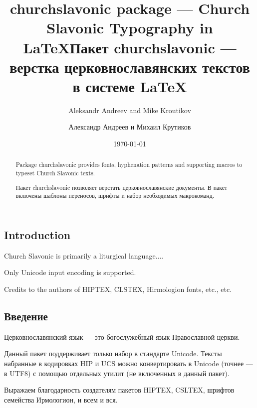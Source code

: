 \usepackage{churchslavonic}
\usepackage{hyperref}

\def\pkg#1{\textsf{#1}}
\def\cs#1{\texttt{\textbackslash #1}}



\begin{EN}
\title{\pkg{churchslavonic} package --- Church Slavonic Typography in \LaTeX}
\author{Aleksandr Andreev and Mike Kroutikov}
\end{EN}

\begin{RU}
\title{Пакет \pkg{churchslavonic} --- верстка церковнославянских текстов в системе \LaTeX}
\author{Александр Андреев и Михаил Крутиков}
\end{RU}

\date{\today}
\maketitle

\begin{EN}
\begin{abstract}
Package \pkg{churchslavonic} provides fonts, hyphenation patterns and supporting macros to typeset
Church Slavonic texts.
\end{abstract}
\end{EN}

\begin{RU}
\begin{abstract}
Пакет \pkg{churchslavonic} позволяет верстать церковнославянские документы. В пакет включены шаблоны переносов,
шрифты и набор необходимых макрокоманд.
\end{abstract}
\end{RU}

\tableofcontents

\begin{EN}
\section{Introduction}
Church Slavonic is primarily a liturgical language....

Only Unicode input encoding is supported.

Credits to the authors of HIPTEX, CLSTEX, Hirmologion fonts, etc., etc. 
\end{EN}

\begin{RU}
\section{Введение}
Церковнославянский язык --- это богослужебный язык Православной церкви.

Данный пакет поддерживает только набор в стандарте Unicode. Тексты набранные в кодировках HIP и UCS
можно конвертировать в Unicode (точнее --- в UTF8) с помощью отдельных утилит (не включенных в данный пакет).

Выражаем благодарность создателям пакетов HIPTEX, CSLTEX, шрифтов семейства Ирмологион, и всем и вся.
\end{RU}

